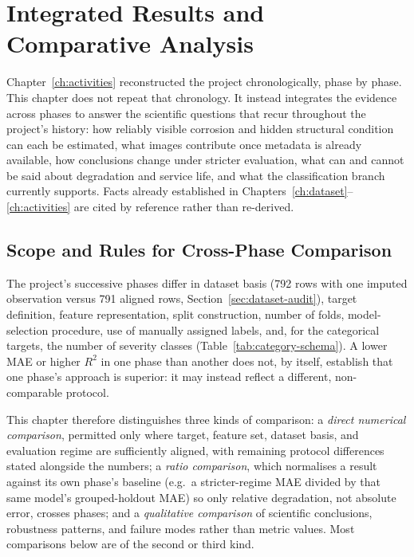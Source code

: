 \chapter{Integrated Results and Comparative Analysis}
\label{ch:results}

Chapter~\ref{ch:activities} reconstructed the project chronologically, phase
by phase. This chapter does not repeat that chronology. It instead
integrates the evidence across phases to answer the scientific questions
that recur throughout the project's history: how reliably visible corrosion
and hidden structural condition can each be estimated, what images
contribute once metadata is already available, how conclusions change under
stricter evaluation, what can and cannot be said about degradation and
service life, and what the classification branch currently supports. Facts
already established in Chapters~\ref{ch:dataset}--\ref{ch:activities} are
cited by reference rather than re-derived.

\section{Scope and Rules for Cross-Phase Comparison}
\label{sec:results-scope}

The project's successive phases differ in dataset basis (792 rows with one
imputed observation versus 791 aligned rows, Section~\ref{sec:dataset-audit}),
target definition, feature representation, split construction, number of
folds, model-selection procedure, use of manually assigned labels, and, for
the categorical targets, the number of severity classes
(Table~\ref{tab:category-schema}). A lower MAE or higher $R^2$ in one phase
than another does not, by itself, establish that one phase's approach is
superior: it may instead reflect a different, non-comparable protocol.

This chapter therefore distinguishes three kinds of comparison: a
\emph{direct numerical comparison}, permitted only where target, feature
set, dataset basis, and evaluation regime are sufficiently aligned, with
remaining protocol differences stated alongside the numbers; a \emph{ratio
comparison}, which normalises a result against its own phase's baseline
(e.g.\ a stricter-regime MAE divided by that same model's grouped-holdout
MAE) so only relative degradation, not absolute error, crosses phases; and
a \emph{qualitative comparison} of scientific conclusions, robustness
patterns, and failure modes rather than metric values. Most comparisons
below are of the second or third kind.

